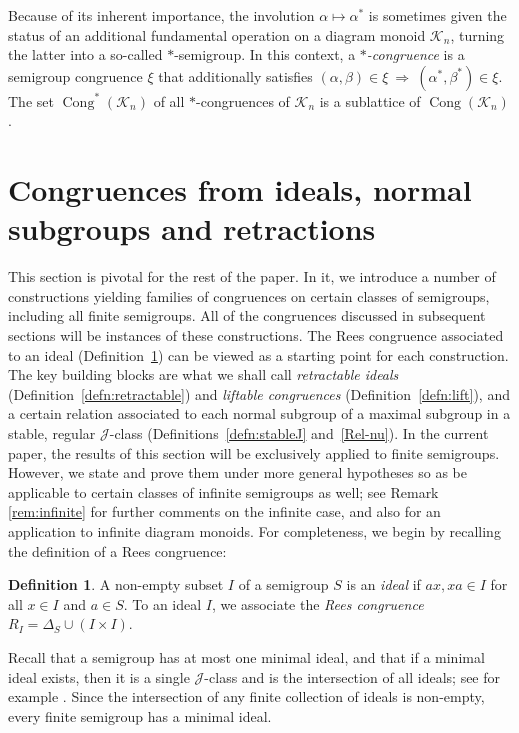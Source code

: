 \documentclass[11pt,a4paper]{article}
\newcommand{\gJ}{\mathrel{\mathscr J}}
\newcommand{\De}{\Delta}
\newcommand{\Cong}{\operatorname{Cong}}
\newcommand{\1}{\id_n}
\renewcommand{\implies}{\ \Rightarrow\ }
\numberwithin{equation}{section}
\theoremstyle{definition}
\newtheorem{defn}[equation]{Definition}
\begin{document}
Because of its inherent importance, the involution $\alpha\mapsto\alpha^\ast$
is sometimes given the status of an additional fundamental operation on a
diagram monoid $\mathcal{K}_n$, turning the latter into a so-called
$\ast$-semigroup.  In this context, a \emph{$\ast$-congruence} is a semigroup
congruence $\xi$ that additionally satisfies $(\alpha,\beta)\in\xi\implies(\alpha^\ast,\beta^\ast)\in\xi$.  The set $\Cong^*(\mathcal{K}_n)$ of all
$*$-congruences of $\mathcal K_n$ is a sublattice of $\Cong(\mathcal{K}_n)$.






\section{Congruences from ideals, normal subgroups and retractions}\label{sec-fam}


This section is pivotal for the rest of the paper.  In it, we introduce a number of constructions yielding families of congruences on certain classes of semigroups, including all finite semigroups.  
%
All of the congruences discussed in subsequent sections will be instances of these constructions.  The Rees congruence associated to an ideal (Definition~\ref{defn:Rees}) can be viewed as a starting point for each construction.  The key building blocks are what we shall call \emph{retractable ideals} (Definition~\ref{defn:retractable}) and \emph{liftable congruences} (Definition~\ref{defn:lift}), and a certain relation associated to each normal subgroup of a maximal subgroup in a stable, regular $\gJ$-class (Definitions~\ref{defn:stableJ} and~\ref{Rel-nu}).  
%
In the current paper, the results of this section will be exclusively applied to finite semigroups.  However, we state and prove them under more general hypotheses so as be applicable to certain classes of infinite semigroups as well; see Remark \ref{rem:infinite} for further comments on the infinite case, and also \cite{ER2018} for an application to infinite diagram monoids.
%
For completeness, we begin by recalling the definition of a Rees congruence:

\begin{defn}\label{defn:Rees}
A non-empty subset $I$ of a semigroup $S$ is an \emph{ideal} if $ax,xa\in I$ for all $x\in I$ and $a\in S$.  To an ideal $I$, we associate the \emph{Rees congruence} $R_I=\De_S\cup(I\times I)$.
\end{defn}


Recall that a semigroup has at most one minimal ideal, and that if a minimal ideal exists, then it is a single $\gJ$-class and is the intersection of all ideals; see for example \cite[Section 3.1]{Howie}.  Since the intersection of any finite collection of ideals is non-empty, every finite semigroup has a minimal ideal.  
\end{document}
